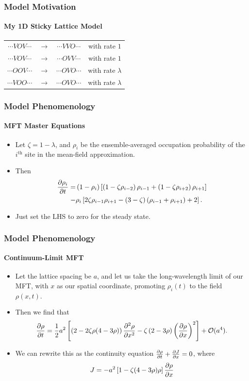 \documentclass{beamer}
\begin{document}
\begin{frame}
\frametitle{Model Motivation}
\framesubtitle{My 1D Sticky Lattice Model}
 \begin{center}
  \begin{tabular}{c c c c}
  $\cdots VOV\cdots$ & $\longrightarrow$ & $\cdots VVO \cdots$ & with rate $1$ \\
  $\cdots VOV\cdots$ & $\longrightarrow$ & $\cdots OVV \cdots$ & with rate $1$ \\
  $\cdots OOV\cdots$ & $\longrightarrow$ & $\cdots OVO \cdots$ & with rate $\lambda$ \\
  $\cdots VOO\cdots$ & $\longrightarrow$ & $\cdots OVO \cdots$ & with rate $\lambda$ \\
 \end{tabular}
 \end{center}
\end{frame}



\begin{frame}
\frametitle{Model Phenomenology}
\framesubtitle{MFT Master Equations}
\begin{itemize}
\item Let $\zeta = 1-\lambda$, and $\rho_i$ be the ensemble-averaged occupation probability of the $i^\mathrm{th}$ site in the mean-field approximation.
\item Then
\begin{align*}
 \frac{\partial \rho_i}{\partial t} = &\left( 1-\rho_i \right) \left[ \left(1-\zeta\rho_{i-2} \right) \rho_{i-1} + \left(1-\zeta\rho_{i+2} \right) \rho_{i+1} \right] \\
 - &\rho_i \left[ 2 \zeta \rho_{i-1} \rho_{i+1}  - (3-\zeta)\left(\rho_{i-1} + \rho_{i+1}\right) + 2 \right].
\end{align*}
\item Just set the LHS to zero for the steady state.
\end{itemize}
\end{frame}

\begin{frame}
\frametitle{Model Phenomenology}
\framesubtitle{Continuum-Limit MFT}
\begin{itemize}
\item Let the lattice spacing be $a$, and let us take the long-wavelength limit of our MFT, with $x$ as our spatial coordinate, promoting $\rho_i(t)$ to the field $\rho(x, t)$.
\item Then we find that
\begin{equation*}
\frac{\partial \rho}{\partial t} = \frac{1}{2} a^2 \left[ \left( 2 - 2 \zeta \rho (4-3\rho) \right) \frac{\partial ^2 \rho}{\partial x^2} - \zeta \left(2-3\rho\right) \left(\frac{\partial \rho}{\partial x}\right)^2 \right] + \mathcal{O}(a^4).
\label{eq: longRangePDE}
\end{equation*}
\item We can rewrite this as the continuity equation $\frac{\partial \rho}{\partial t} + \frac{\partial J}{\partial x} = 0$, where
\begin{equation*}
 J = -a^2 \left[ 1 - \zeta (4-3\rho)\rho \right] \frac{\partial \rho}{\partial x}
\end{equation*}
\end{itemize}
\end{frame}
\end{document}
